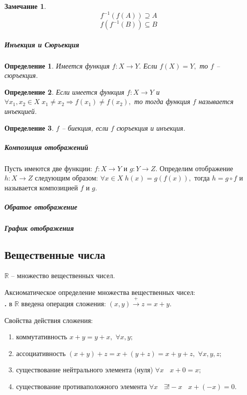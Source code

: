 \documentclass{article}
\newcommand{\RomanNumeralCaps}[1]
    {\MakeUppercase{\romannumeral #1}}
\newtheorem{Remark}{Замечание}[section]
\newtheorem{Definition}{Определение}[section]
\begin{document}
\begin{Remark}
$$f^{-1}\left(f(A)\right)\supseteq  A$$
$$f\left(f^{-1}(B)\right) \subseteq B$$
\end{Remark}

\subparagraph{Инъекция и Сюръекция}
\begin{Definition}
Имеется функция $f:X \rightarrow Y.$ Если $f(X)=Y,$ то $f$ -- сюръекция.
\end{Definition}
\begin{Definition}
Если имеется функция $f:X \rightarrow Y$ и $\forall x_1, x_2 \in X \; x_1 \neq x_2 \Rightarrow f(x_1)\neq f(x_2),$ то тогда функция $f$ называется инъекцией.
\end{Definition}
\begin{Definition}
$f$ -- биекция, если $f$ сюръекция и инъекция.
\end{Definition} 

\subparagraph{Композиция отображений}
Пусть имеются две функции: $f:X \rightarrow Y$ и $g:Y \rightarrow Z.$
Определим отображение $h:X \rightarrow Z$ следующим образом: $\forall x\in X \; h(x)=g(f(x)),$ тогда $h=g\circ f$ и называется композицией $f$ и $g.$

\subparagraph{Обратое отображение}
\subparagraph{График отображения}

\subsection{Вещественные  числа}
$\mathbb{R}$ -- множество вещественных чисел.

Аксиоматическое определение множества вещественных чисел:\\

{\bf \RomanNumeralCaps{1}.} в $\mathbb{R}$ введена операция сложения: $(x,y) \xrightarrow{\text{+}} z=x+y.$
\par Свойства действия сложения:
\begin{enumerate}
\item коммутативность \quad  $x+y=y+x,$ $\forall x, y ;$
\item ассоциативность \quad  $(x+y)+z=x+(y+z)=x+y+z,$ $\forall x, y, z ;$
\item существование нейтрального элемента (нуля) \quad $\forall x\;\;$ $x+0=x;$
\item существование противаположного элемента \quad $\forall x\;\;$  $\exists ! -x\;\;$ $x+(-x)=0.$
\end{enumerate}
\end{document}
